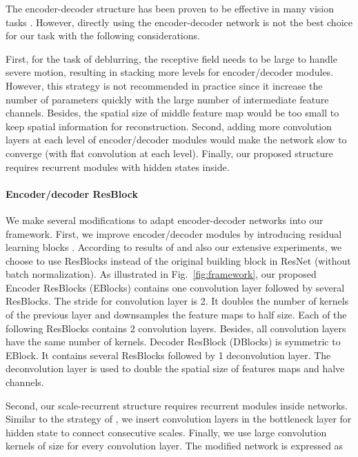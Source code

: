 \documentclass[10pt,twocolumn,letterpaper]{article}
\begin{document}
The encoder-decoder structure has been proven to be effective in many vision tasks \cite{liu2017video,su2017deep,tao2017spmc,xu2017deep}. However, directly using the encoder-decoder network is not the best choice for our task with the following considerations. 

First, for the task of deblurring, the receptive field needs to be large to handle severe motion, resulting in stacking more levels for encoder/decoder modules. However, this strategy is not recommended in practice since it increase the number of parameters quickly with the large number of intermediate feature channels. Besides, the spatial size of middle feature map would be too small to keep spatial information for reconstruction. Second, adding more convolution layers at each level of encoder/decoder modules would make the network slow to converge (with flat convolution at each level). Finally, our proposed structure requires recurrent modules with hidden states inside.



\vspace{-0.1in}
\paragraph{Encoder/decoder ResBlock}
We make several modifications to adapt encoder-decoder networks into our framework. First, we improve encoder/decoder modules by introducing residual learning blocks \cite{he2016deep}. According to results of \cite{nah2017deep} and also our extensive experiments, we choose to use ResBlocks instead of the original building block in ResNet \cite{he2016deep} (without batch normalization). As illustrated in Fig.~\ref{fig:framework}, our proposed Encoder ResBlocks (EBlocks) contains one convolution layer followed by several ResBlocks. The stride for convolution layer is 2. It doubles the number of kernels of the previous layer and downsamples the feature maps to half size. Each of the following ResBlocks contains 2 convolution layers. Besides, all convolution layers have the same number of kernels. Decoder ResBlock (DBlocks) is symmetric to EBlock. It contains several ResBlocks followed by 1 deconvolution layer. The deconvolution layer is used to double the spatial size of features maps and halve channels.

Second, our scale-recurrent structure requires recurrent modules inside networks. Similar to the strategy of \cite{tao2017spmc}, we insert convolution layers in the bottleneck layer for hidden state to connect consecutive scales. Finally, we use large convolution kernels of size  for every convolution layer. The modified network is expressed as
\end{document}
